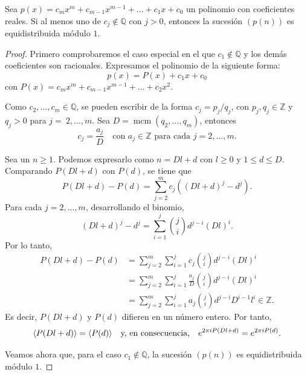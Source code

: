 \begin{theorem}
    \label{teo:polinomios_weyl}
    Sea $p(x)=c_m x^m + c_{m-1} x^{m-1} + \dots + c_1 x + c_0$ un polinomio con coeficientes 
    reales. Si al menos uno de $c_j \notin \mathbb{Q}$ con $j>0$, entonces la sucesión $(p(n))$ 
    es equidistribuida módulo $1$.
\end{theorem}

\begin{proof}
    Primero comprobaremos el caso especial en el que $c_1 \notin \mathbb{Q}$ 
    y los demás coeficientes son racionales.
    Expresamos el polinomio de la siguiente forma:
    \[
        p(x) = P(x) + c_1x + c_0
    \]
    con $P(x) = c_m x^m + c_{m-1} x^{m-1} + \dots + c_2 x^2$.

    Como $c_2,\dots,c_m \in \mathbb{Q}$, se pueden escribir de la forma $c_j = p_j/q_j$, 
    con $p_j,q_j \in \mathbb{Z}$ y $q_j > 0$ para $j=~2,\dots,m$. 
    Sea $D = \operatorname{mcm}(q_2,\dots,q_m)$, entonces
    \[
        c_j = \frac{a_j}{D} \quad \text{con } a_j \in \mathbb{Z} \text{ para cada } j=2,\dots,m.
    \]

    Sea un $n\geq1$. Podemos expresarlo como $n=Dl+d$ con $l \geq 0$ y $1 \leq d \leq D$.
    Comparando $P(Dl+d)$ con $P(d)$, se tiene que
    \[
        P(Dl+d)-P(d)= \sum_{j=2}^m c_j ((Dl+d)^j - d^j).
    \]
    Para cada $j=2,...,m$, desarrollando el binomio,
    \[
        (Dl+d)^j - d^j = \sum_{i=1}^j \binom{j}{i} d^{j-i} (Dl)^i.
    \]
    Por lo tanto,
    \begin{align*}
        P(Dl+d)-P(d) 
        &= \sum_{j=2}^m \sum_{i=1}^j c_j \binom{j}{i} d^{j-i} (Dl)^i \\
        &= \sum_{j=2}^m \sum_{i=1}^j \frac{a_j}{D} \binom{j}{i} d^{j-i} (Dl)^i \\
        &= \sum_{j=2}^m \sum_{i=1}^j a_j \binom{j}{i} d^{j-i} D^{i-1} l^i \in \mathbb{Z}.
    \end{align*}
    Es decir, $P(Dl+d)$ y $P(d)$ difieren en un número entero. Por tanto,
    \[
        \langle P(Dl+d) \rangle = \langle P(d) \rangle 
        \quad \text{y, en consecuencia,} \quad
        e^{2\pi i P(Dl+d)} = e^{2\pi i P(d)}.
    \]

    Veamos ahora que, para el caso $c_1 \notin \mathbb{Q}$, la sucesión 
    $(p(n))$ es equidistribuida módulo $1$.


\end{proof}
